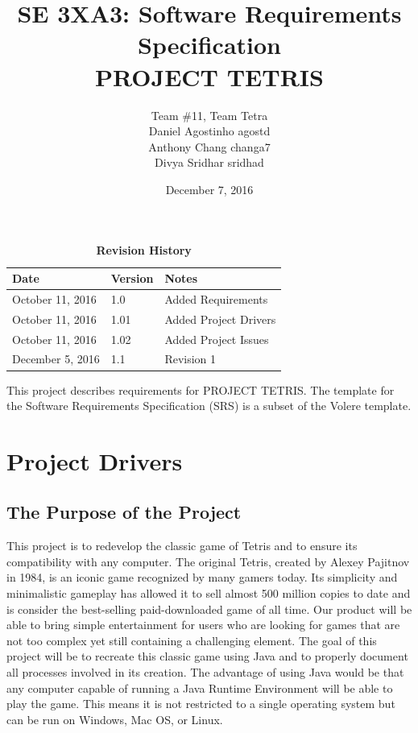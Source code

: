 \documentclass[12pt, titlepage]{article}
\title{SE 3XA3: Software Requirements Specification\\PROJECT TETRIS}
\author{Team \#11, Team Tetra
		\\ Daniel Agostinho agostd
		\\ Anthony Chang changa7
		\\ Divya Sridhar sridhad
}
\date{December 7, 2016}
\begin{document}
\maketitle

\tableofcontents
\listoftables
\listoffigures

\begin{table}[h!]
\caption{\bf Revision History}
\begin{tabularx}{\textwidth}{p{3cm}p{2cm}X}
\toprule {\bf Date} & {\bf Version} & {\bf Notes}\\
\midrule
October 11, 2016 & 1.0 & Added Requirements\\
October 11, 2016 & 1.01 & Added Project Drivers\\
October 11, 2016 & 1.02 & Added Project Issues\\
December 5, 2016 & 1.1 & Revision 1\\
\bottomrule
\end{tabularx}
\end{table}
\newpage

This project describes requirements for PROJECT TETRIS. The template for the Software Requirements Specification (SRS) is a subset of the Volere template.

\section{Project Drivers}

\subsection{The Purpose of the Project}
This project is to redevelop the classic game of Tetris and to ensure its compatibility with any computer. The original Tetris, created by Alexey Pajitnov in 1984, is an iconic game recognized by many gamers today. Its simplicity and minimalistic gameplay has allowed it to sell almost 500 million copies to date and is consider the best-selling paid-downloaded game of all time. 
Our product will be able to bring simple entertainment for users who are looking for games that are not too complex yet still containing a challenging element. The goal of this project will be to recreate this classic game using Java and to properly document all processes involved in its creation. The advantage of using Java would be that any computer capable of running a Java Runtime Environment will be able to play the game. This means it is not restricted to a single operating system but can be run on Windows, Mac OS, or Linux.
\end{document}
